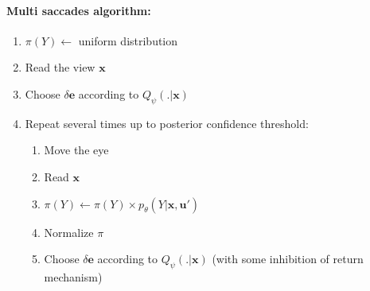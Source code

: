 \paragraph{Multi saccades algorithm:}
\begin{enumerate}
\item $\pi(Y) \leftarrow$ uniform distribution
\item Read the view $\boldsymbol{x}$
\item Choose $\delta\boldsymbol{e}$ according to $Q_\psi(.|\boldsymbol{x})$
\item Repeat several times up to posterior confidence threshold:
	\begin{enumerate}
		\item Move the eye 		
		\item Read $\boldsymbol{x}$
		\item $\pi(Y) \leftarrow \pi(Y) \times p_\theta(Y|\boldsymbol{x},\hat{\boldsymbol{u}}')$
		\item Normalize $\pi$ 
		\item Choose $\delta\boldsymbol{e}$ according to $Q_\psi(.|\boldsymbol{x})$ (with some inhibition of return mechanism)
	\end{enumerate}
\end{enumerate}

